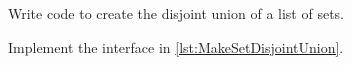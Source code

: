 
\begin{publictodo}
    Write code to create the disjoint union of a list of sets.

    Implement the interface in \cref{lst:MakeSetDisjointUnion}.
\end{publictodo}


